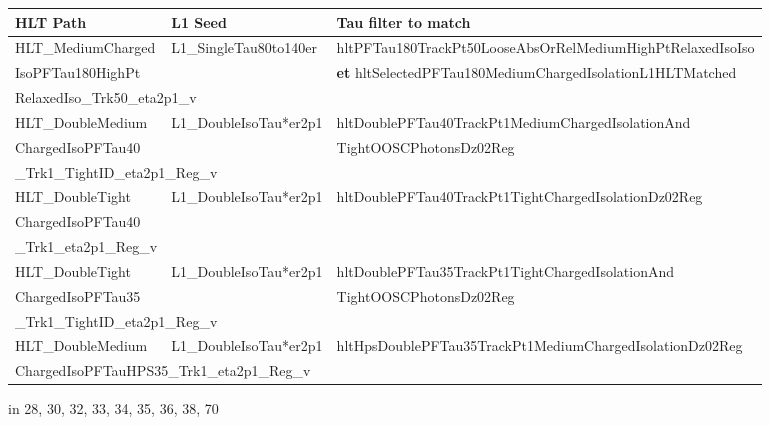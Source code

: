 {\footnotesize
\begin{tabularx}{\textwidth}{llX}
\toprule
HLT Path & L1 Seed & Tau filter to match \\
\midrule
HLT\_MediumCharged
&
L1\_SingleTau80to140er
&
hltPFTau180TrackPt50LooseAbsOrRelMediumHighPtRelaxedIsoIso\!\!\!
\\
IsoPFTau180HighPt
&
&
\textbf{et} hltSelectedPFTau180MediumChargedIsolationL1HLTMatched
\\
\multicolumn{2}{l}{RelaxedIso\_Trk50\_eta2p1\_v}
\\\hline
HLT\_DoubleMedium
&
L1\_DoubleIsoTau*er2p1
&
hltDoublePFTau40TrackPt1MediumChargedIsolationAnd
\\
ChargedIsoPFTau40
&
&
TightOOSCPhotonsDz02Reg
\\
\multicolumn{2}{l}{\_Trk1\_TightID\_eta2p1\_Reg\_v}
\\\hline
HLT\_DoubleTight
&
L1\_DoubleIsoTau*er2p1
&
hltDoublePFTau40TrackPt1TightChargedIsolationDz02Reg
\\
ChargedIsoPFTau40
\\
\_Trk1\_eta2p1\_Reg\_v
\\\hline
HLT\_DoubleTight
&
L1\_DoubleIsoTau*er2p1
&
hltDoublePFTau35TrackPt1TightChargedIsolationAnd
\\
ChargedIsoPFTau35
&
&
TightOOSCPhotonsDz02Reg
\\
\multicolumn{2}{l}{\_Trk1\_TightID\_eta2p1\_Reg\_v}
\\\hline
HLT\_DoubleMedium
&
L1\_DoubleIsoTau*er2p1
&
hltHpsDoublePFTau35TrackPt1MediumChargedIsolationDz02Reg
\\
\multicolumn{2}{l}{ChargedIsoPFTauHPS35\_Trk1\_eta2p1\_Reg\_v}
\\
\bottomrule
\end{tabularx}

\begin{flushleft}
\up{*} in 28, 30, 32, 33, 34, 35, 36, 38, 70
\end{flushleft}
}
